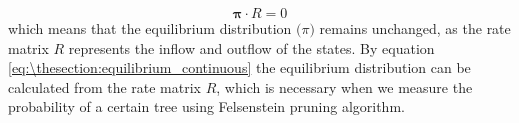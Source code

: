 \documentclass[12pt]{book}
\begin{document}
        \begin{equation}\label{eq:\thesection:equilibrium_continuous}
            \mathbf{\pi} \cdot R = 0
        \end{equation}
        which means that the equilibrium distribution $\mathbf(\pi)$ remains unchanged, as the rate matrix $R$ represents the inflow and outflow of the states. By equation \eqref{eq:\thesection:equilibrium_continuous} the equilibrium distribution can be calculated from the rate matrix $R$, which is necessary when we measure the probability of a certain tree using Felsenstein pruning algorithm.

\ifx\allfiles\undefined
\end{document}
